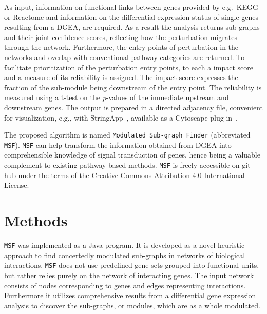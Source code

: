 \documentclass[10pt,a4paper,twocolumn]{article}
\begin{document}
	As input, information on functional links between genes
        provided by e.g.~KEGG or Reactome and information on the
        differential expression status of single genes resulting from
        a DGEA, are required. As a result the analysis returns
        sub-graphs and their joint confidence scores, reflecting how
        the perturbation migrates through the network. Furthermore,
        the entry points of perturbation in the networks and overlap
        with conventional pathway categories are returned. To
        facilitate prioritization of the perturbation entry points, to
        each a impact score and a measure of its reliability is
        assigned. The impact score expresses the fraction of the
        sub-module being downstream of the entry point. The
        reliability is measured using a t-test on the
        \textit{p}-values of the immediate upstream and downstream
        genes. The output is prepared in a directed adjacency file,
        convenient for visualization, e.g., with
        StringApp~\cite{StringApp}, available as a Cytoscape
        plug-in~\cite{Cyto}.
	
	The proposed algorithm is named \texttt{Modulated Sub-graph
          Finder} (abbreviated \texttt{MSF}). \texttt{MSF} can help
        transform the information obtained from DGEA into
        comprehensible knowledge of signal transduction of genes,
        hence being a valuable complement to existing pathway based
        methods. \texttt{MSF} is freely accessible on git hub under
        the terms of the Creative Commons Attribution 4.0
        International License.
	
	
	\section*{Methods}
	
	\texttt{MSF} was implemented as a Java program. It is
        developed as a novel heuristic approach to find concertedly
        modulated sub-graphs in networks of biological
        interactions. \texttt{MSF} does not use predefined gene sets
        grouped into functional units, but rather relies purely on the
        network of interacting genes. The input network consists of
        nodes corresponding to genes and edges representing
        interactions. Furthermore it utilizes comprehensive results
        from a differential gene expression analysis to discover the
        sub-graphs, or modules, which are as a whole modulated.
	
\end{document}
